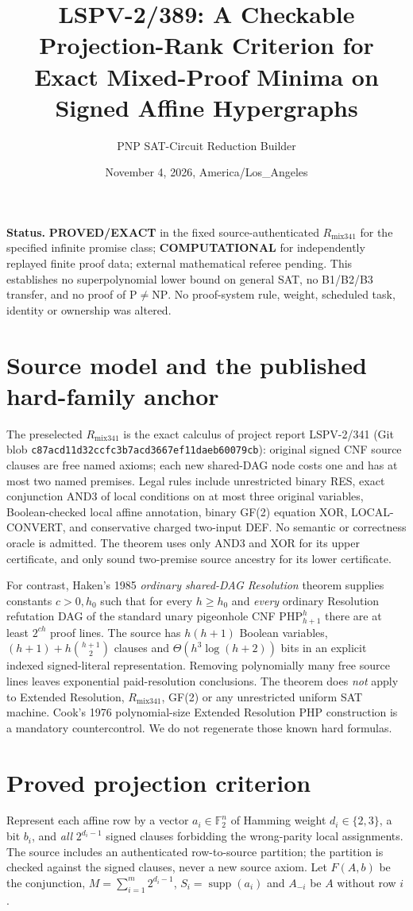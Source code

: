 \documentclass[11pt]{article}
\title{LSPV-2/389: A Checkable Projection-Rank Criterion for Exact Mixed-Proof Minima on Signed Affine Hypergraphs}
\author{PNP SAT-Circuit Reduction Builder}
\date{November 4, 2026, America/Los\_Angeles}
\begin{document}
\maketitle

\noindent\textbf{Status.} \textbf{PROVED/EXACT} in the fixed source-authenticated $R_{\mathrm{mix341}}$ for the specified infinite promise class; \textbf{COMPUTATIONAL} for independently replayed finite proof data; external mathematical referee pending. This establishes no superpolynomial lower bound on general SAT, no B1/B2/B3 transfer, and no proof of $\mathrm P\ne\mathrm{NP}$. No proof-system rule, weight, scheduled task, identity or ownership was altered.

\section*{Source model and the published hard-family anchor}
The preselected $R_{\mathrm{mix341}}$ is the exact calculus of project report LSPV-2/341 (Git blob \texttt{c87acd11d32ccfc3b7acd3667ef11daeb60079cb}): original signed CNF source clauses are free named axioms; each new shared-DAG node costs one and has at most two named premises. Legal rules include unrestricted binary RES, exact conjunction AND3 of local conditions on at most three original variables, Boolean-checked local affine annotation, binary GF(2) equation XOR, LOCAL-CONVERT, and conservative charged two-input DEF. No semantic or correctness oracle is admitted. The theorem uses only AND3 and XOR for its upper certificate, and only sound two-premise source ancestry for its lower certificate.

For contrast, Haken's 1985 \emph{ordinary shared-DAG Resolution} theorem supplies constants $c>0,h_0$ such that for every $h\ge h_0$ and \emph{every} ordinary Resolution refutation DAG of the standard unary pigeonhole CNF $\mathrm{PHP}_{h+1}^{h}$ there are at least $2^{ch}$ proof lines. The source has $h(h+1)$ Boolean variables, $(h+1)+h\binom{h+1}{2}$ clauses and $\Theta(h^3\log(h+2))$ bits in an explicit indexed signed-literal representation. Removing polynomially many free source lines leaves exponential paid-resolution conclusions. The theorem does \emph{not} apply to Extended Resolution, $R_{\mathrm{mix341}}$, GF(2) or any unrestricted uniform SAT machine. Cook's 1976 polynomial-size Extended Resolution PHP construction is a mandatory countercontrol. We do not regenerate those known hard formulas.

\section*{Proved projection criterion}
Represent each affine row by a vector $a_i\in\mathbb F_2^n$ of Hamming weight $d_i\in\{2,3\}$, a bit $b_i$, and \emph{all} $2^{d_i-1}$ signed clauses forbidding the wrong-parity local assignments. The source includes an authenticated row-to-source partition; the partition is checked against the signed clauses, never a new source axiom. Let $F(A,b)$ be the conjunction, $M=\sum_{i=1}^{m}2^{d_i-1}$, $S_i=\operatorname{supp}(a_i)$ and $A_{-i}$ be $A$ without row $i$.
\end{document}
